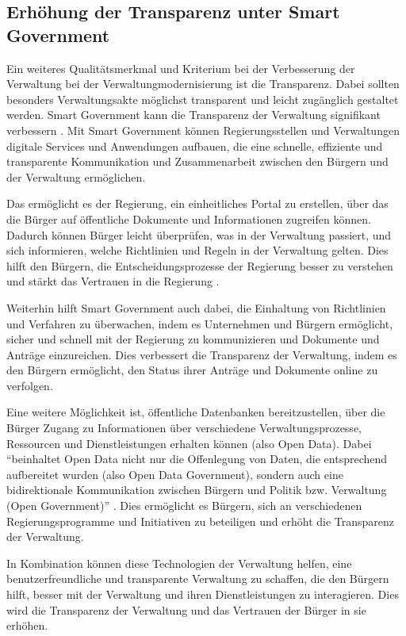 \subsection{Erhöhung der Transparenz unter Smart Government}
Ein weiteres Qualitätsmerkmal und Kriterium bei der Verbesserung der Verwaltung bei der Verwaltungmodernisierung ist die Transparenz.
Dabei sollten besonders Verwaltungsakte möglichst transparent und leicht zugänglich gestaltet werden.
Smart Government kann die Transparenz der Verwaltung signifikant verbessern \citep[Vgl.][S.87]{Kersting2017}.
Mit Smart Government können Regierungsstellen und Verwaltungen digitale Services und Anwendungen aufbauen, die eine schnelle, effiziente und transparente Kommunikation und Zusammenarbeit zwischen den Bürgern und der Verwaltung ermöglichen. 
\par
Das ermöglicht es der Regierung, ein einheitliches Portal zu erstellen, über das die Bürger auf öffentliche Dokumente und Informationen zugreifen können. 
Dadurch können Bürger leicht überprüfen, was in der Verwaltung passiert, und sich informieren, welche Richtlinien und Regeln in der Verwaltung gelten. 
Dies hilft den Bürgern, die Entscheidungsprozesse der Regierung besser zu verstehen und stärkt das Vertrauen in die Regierung \citep[Vgl.][S.94]{Kersting2017}.
\par
Weiterhin hilft Smart Government auch dabei, die Einhaltung von Richtlinien und Verfahren zu überwachen, indem es Unternehmen und Bürgern ermöglicht, sicher und schnell mit der Regierung zu kommunizieren und Dokumente und Anträge einzureichen. 
Dies verbessert die Transparenz der Verwaltung, indem es den Bürgern ermöglicht, den Status ihrer Anträge und Dokumente online zu verfolgen.
\par
Eine weitere Möglichkeit ist, öffentliche Datenbanken bereitzustellen, über die Bürger Zugang zu Informationen über verschiedene Verwaltungsprozesse, Ressourcen und Dienstleistungen erhalten können (also Open Data).
Dabei ``beinhaltet Open Data nicht nur die Offenlegung von Daten, die entsprechend aufbereitet wurden (also Open Data Government), sondern auch eine bidirektionale Kommunikation zwischen Bürgern und Politik bzw. Verwaltung (Open Government)'' \citep[Vgl.][S.94]{Kersting2017}.
Dies ermöglicht es Bürgern, sich an verschiedenen Regierungsprogramme und Initiativen zu beteiligen und erhöht die Transparenz der Verwaltung.
\par
In Kombination können diese Technologien der Verwaltung helfen, eine benutzerfreundliche und transparente Verwaltung zu schaffen, die den Bürgern hilft, besser mit der Verwaltung und ihren Dienstleistungen zu interagieren. 
Dies wird die Transparenz der Verwaltung und das Vertrauen der Bürger in sie erhöhen.